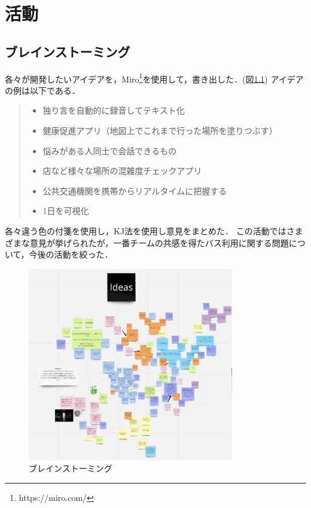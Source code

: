 \chapter{活動}
\section{ブレインストーミング}
各々が開発したいアイデアを，Miro\footnote{https://miro.com/}を使用して，書き出した．(図\ref{fig:brainstorm})
アイデアの例は以下である．

\begin{quote}
    \begin{itemize}
        \item 独り言を自動的に録音してテキスト化
        \item 健康促進アプリ（地図上でこれまで行った場所を塗りつぶす）
        \item 悩みがある人同士で会話できるもの
        \item 店など様々な場所の混雑度チェックアプリ
        \item 公共交通機関を携帯からリアルタイムに把握する
        \item 1日を可視化
    \end{itemize}
\end{quote}

各々違う色の付箋を使用し，KJ法を使用し意見をまとめた．
この活動ではさまざまな意見が挙げられたが，一番チームの共感を得たバス利用に関する問題について，今後の活動を絞った．

\begin{figure}[H]
    \centering
    \includegraphics[width=9cm]{images/brainstorm.png}
    \caption{ブレインストーミング}
    \label{fig:brainstorm}
\end{figure}

